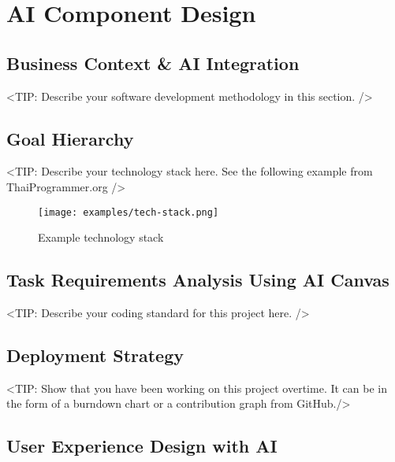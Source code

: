 \chapter{AI Component Design}
\label{chap:AI-Component-Design}

\section{Business Context \& AI Integration}
\label{section:Business-Context-AI-Integration}
<TIP: Describe your software development methodology in this section. />

\section{Goal Hierarchy}
\label{section:Goal-Hierarchy}
<TIP: Describe your technology stack here. See the following example from ThaiProgrammer.org />
\begin{figure}[h]
    \centering
    \texttt{[image: examples/tech-stack.png]}
    \caption{Example technology stack}
\end{figure}

\section{Task Requirements Analysis Using AI Canvas}
\label{section:Task-Requirements-Analysis-Using-AI-Canvas}
<TIP: Describe your coding standard for this project here. />

\section{Deployment Strategy}
\label{section:Deployment-Strategy}
<TIP: Show that you have been working on this project overtime.
It can be in the form of a burndown chart or a contribution graph from GitHub./>

\section{User Experience Design with AI}
\label{section:User-Experience-Design-with-AI}